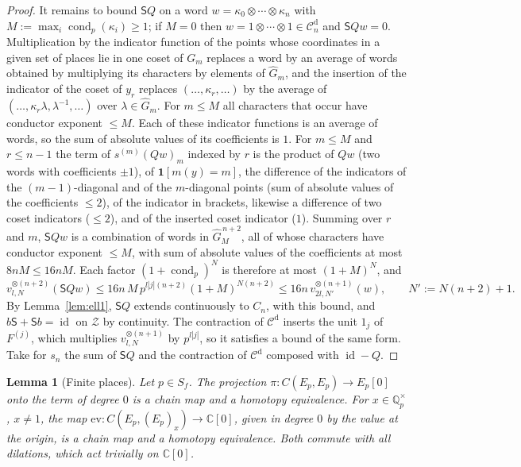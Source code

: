 \documentclass[11pt]{amsart}
\newtheorem{lemma}[theorem]{Lemma}
\theoremstyle{definition}
\theoremstyle{remark}
\newcommand{\C}{\mathbb C}
\newcommand{\Q}{\mathbb Q}
\newcommand{\id}{\operatorname{id}}
\newcommand{\cond}{\operatorname{cond}}
\begin{document}
\begin{proof}
It remains to bound $\mathsf SQ$ on a word $w=\kappa_0\otimes\cdots\otimes\kappa_n$
with $M:=\max_i\cond_p(\kappa_i)\ge1$; if $M=0$ then
$w=1\otimes\cdots\otimes1\in\mathcal C^{\mathrm d}_n$ and $\mathsf SQw=0$. 
Multiplication by the indicator
function of the points whose coordinates in a given set of places lie in one
coset of $G_m$ replaces a word by an average of words obtained by multiplying
its characters by elements of $\widehat G_m$, and the insertion of the indicator
of the coset of $y_r$ replaces $(\dots,\kappa_r,\dots)$ by the average of
$(\dots,\kappa_r\lambda,\lambda^{-1},\dots)$ over $\lambda\in\widehat G_m$.  For
$m\le M$ all characters that occur have conductor exponent $\le M$.  Each of
these indicator functions is an average of words, so the sum of absolute values
of its coefficients is $1$.  For $m\le M$ and $r\le n-1$ the term of
$s^{(m)}(Qw)_m$ indexed by $r$ is the product of $Qw$ (two words with
coefficients $\pm1$), of $\mathbf 1[m(y)=m]$, the difference of the indicators
of the $(m-1)$-diagonal and of the $m$-diagonal points (sum of absolute values
of the coefficients $\le2$), of the indicator in brackets, likewise a difference
of two coset indicators ($\le2$), and of the inserted coset indicator ($1$).
Summing over $r$ and $m$, $\mathsf SQw$ is a combination of words in
$\widehat G_M^{\,n+2}$, all of whose characters have conductor exponent
$\le M$, with sum of absolute values of the coefficients at most
$8nM\le16nM$.  Each factor $(1+\cond_p)^{N}$ is therefore at most
$(1+M)^{N}$, and
\[
v_{l,N}^{\otimes(n+2)}(\mathsf SQw)\le16n\,M\,p^{l|j|(n+2)}(1+M)^{N(n+2)}
\le16n\,v_{2l,N'}^{\otimes(n+1)}(w),\qquad N':=N(n+2)+1 .
\]
By Lemma~\ref{lem:ell1}, $\mathsf SQ$ extends continuously to $C_n$, with this
bound, and $b\mathsf S+\mathsf Sb=\id$ on $\mathcal Z$ by continuity.  The
contraction of $\mathcal C^{\mathrm d}$ inserts the unit $1_j$ of $F^{(j)}$, which
multiplies $v_{l,N}^{\otimes(n+1)}$ by $p^{l|j|}$, so it satisfies a bound of the
same form.  Take for $s_n$ the sum of $\mathsf SQ$ and the contraction of
$\mathcal C^{\mathrm d}$ composed with $\id-Q$.
\end{proof}

\begin{lemma}[Finite places]\label{lem:finuntw}
Let $p\in S_f$.  The projection $\pi:C(E_p,E_p)\to E_p[0]$ onto the term of
degree $0$ is a chain map and a homotopy equivalence.  For $x\in\Q_p^{\times}$,
$x\ne1$, the map $\mathrm{ev}:C(E_p,(E_p)_x)\to\C[0]$, given in degree $0$ by the
value at the origin, is a chain map and a homotopy equivalence.  Both commute
with all dilations, which act trivially on $\C[0]$.
\end{lemma}
\end{document}
